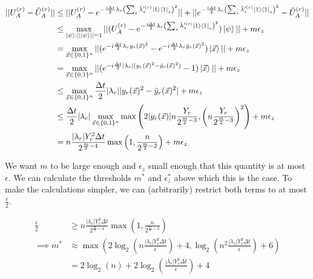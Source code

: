\begin{equation}
    \begin{split}
        ||U_A^{(r)} - \tilde{U}_A^{(r)}|| &\leq ||U_A^{(r)} - e^{-\frac{i\Delta t}{2}\lambda_r\left(\sum_s \tilde{\lambda}'^{(r)}_s \ket{1}\bra{1}_s\right)^2}|| + ||e^{-\frac{i\Delta t}{2}\lambda_r\left(\sum_s \tilde{\lambda}'^{(r)}_s \ket{1}\bra{1}_s\right)^2} - \tilde{U}_A^{(r)}|| \\
        &\leq \max_{\ket{\psi} : ||\ket{\psi}|| = 1} ||(U_A^{(r)} - e^{-\frac{i\Delta t}{2}\lambda_r\left(\sum_s \tilde{\lambda}'^{(r)}_s \ket{1}\bra{1}_s\right)^2})\ket{\psi}|| + m\epsilon_z \\
        &= \max_{\vec{x} \in \{0, 1\}^n} ||(e^{-i\frac{\Delta t}{2}\lambda_ry_r(\vec{x})^2} - e^{-i\frac{\Delta t}{2}\lambda_r\tilde{y}_r(\vec{x})^2})\ket{\vec{x}}|| + m\epsilon_z \\
        &= \max_{\vec{x} \in \{0, 1\}^n} ||(e^{-i\frac{\Delta t}{2}|\lambda_r|(y_r(\vec{x})^2 - \tilde{y}_r(\vec{x})^2)} - 1)\ket{\vec{x}}|| + m\epsilon_z \\
        &\leq \max_{\vec{x} \in \{0, 1\}^n} \frac{\Delta t}{2}|\lambda_r||y_r(\vec{x})^2 - \tilde{y}_r(\vec{x})^2| + m\epsilon_z \\
        &\leq \frac{\Delta t}{2}|\lambda_r|\max_{\vec{x} \in \{0, 1\}^n} \max\left(2|y_r(\vec{x})|n\frac{Y_r}{2^{\frac{m}{2} - 3}}, \left(n\frac{Y_r}{2^{\frac{m}{2} - 3}}\right)^2\right) + m\epsilon_z \\
        &= n\frac{|\lambda_r| Y_r^2\Delta t}{2^{\frac{m}{2} - 4}}\max\left(1, \frac{n}{2^{\frac{m}{2} - 2}}\right) + m\epsilon_z
    \end{split}
\end{equation}

We want $m$ to be large enough and $\epsilon_z$ small enough that this quantity is at most $\epsilon$. We can calculate the thresholds $m^*$ and $\epsilon_z^*$ above which this is the case. To make the calculations simpler, we can (arbitrarily) restrict both terms to at most $\frac{\epsilon}{2}$.

\begin{equation}
    \begin{split}
        \frac{\epsilon}{2} &\geq n\frac{|\lambda_r| Y_r^2\Delta t}{2^{\frac{m}{2} - 4}}\max\left(1, \frac{n}{2^{\frac{m}{2} - 2}}\right) \\
        \implies m^* &\approx \max(2\log_2\left(n\frac{|\lambda_r|Y_r^2\Delta t}{\epsilon}\right) + 4, \log_2\left(n^2\frac{|\lambda_r|Y_r^2\Delta t}{\epsilon}\right) + 6) \\
        &= 2\log_2(n) + 2\log_2\left(\frac{|\lambda_r|Y_r^2\Delta t}{\epsilon}\right) + 4 \label{eq: m_min}
    \end{split}
\end{equation}

